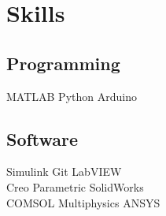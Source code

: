 \documentclass[]{deedy-resume-openfont}
\begin{document}
\begin{minipage}[t]{0.33\textwidth}

%



\section{Skills}

\subsection{Programming}

MATLAB \textbullet{}  Python \textbullet{} Arduino

\sectionsep

\subsection{Software}
Simulink \textbullet{} Git \textbullet{} LabVIEW \textbullet{}\\
Creo Parametric \textbullet{} SolidWorks \textbullet{}\\ 
COMSOL Multiphysics \textbullet{}  ANSYS


\sectionsep %



\end{minipage}
\end{document}
